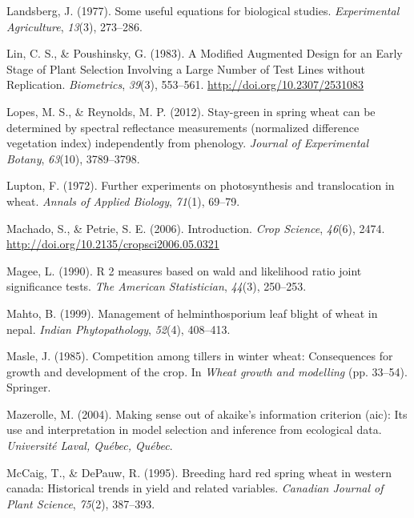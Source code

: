 \documentclass[12pt,oneside]{dukestatscithesis} %
\newlength{\cslhangindent}
\newenvironment{cslreferences}%
  {\setlength{\parindent}{0pt}%
  \everypar{\setlength{\hangindent}{\cslhangindent}}\ignorespaces}%
  {\par}
\begin{document}
\begin{cslreferences}
\leavevmode\hypertarget{ref-landsberg1977some}{}%
Landsberg, J. (1977). Some useful equations for biological studies. \emph{Experimental Agriculture}, \emph{13}(3), 273--286.

\leavevmode\hypertarget{ref-lin_modified_1983}{}%
Lin, C. S., \& Poushinsky, G. (1983). A Modified Augmented Design for an Early Stage of Plant Selection Involving a Large Number of Test Lines without Replication. \emph{Biometrics}, \emph{39}(3), 553--561. \url{http://doi.org/10.2307/2531083}

\leavevmode\hypertarget{ref-lopes2012stay}{}%
Lopes, M. S., \& Reynolds, M. P. (2012). Stay-green in spring wheat can be determined by spectral reflectance measurements (normalized difference vegetation index) independently from phenology. \emph{Journal of Experimental Botany}, \emph{63}(10), 3789--3798.

\leavevmode\hypertarget{ref-lupton1972further}{}%
Lupton, F. (1972). Further experiments on photosynthesis and translocation in wheat. \emph{Annals of Applied Biology}, \emph{71}(1), 69--79.

\leavevmode\hypertarget{ref-machado_introduction_2006}{}%
Machado, S., \& Petrie, S. E. (2006). Introduction. \emph{Crop Science}, \emph{46}(6), 2474. \url{http://doi.org/10.2135/cropsci2006.05.0321}

\leavevmode\hypertarget{ref-magee1990r}{}%
Magee, L. (1990). R 2 measures based on wald and likelihood ratio joint significance tests. \emph{The American Statistician}, \emph{44}(3), 250--253.

\leavevmode\hypertarget{ref-mahto1999management}{}%
Mahto, B. (1999). Management of helminthosporium leaf blight of wheat in nepal. \emph{Indian Phytopathology}, \emph{52}(4), 408--413.

\leavevmode\hypertarget{ref-masle1985competition}{}%
Masle, J. (1985). Competition among tillers in winter wheat: Consequences for growth and development of the crop. In \emph{Wheat growth and modelling} (pp. 33--54). Springer.

\leavevmode\hypertarget{ref-mazerolle2004making}{}%
Mazerolle, M. (2004). Making sense out of akaike's information criterion (aic): Its use and interpretation in model selection and inference from ecological data. \emph{Université Laval, Québec, Québec}.

\leavevmode\hypertarget{ref-mccaig1995breeding}{}%
McCaig, T., \& DePauw, R. (1995). Breeding hard red spring wheat in western canada: Historical trends in yield and related variables. \emph{Canadian Journal of Plant Science}, \emph{75}(2), 387--393.


\end{cslreferences}
\end{document}
